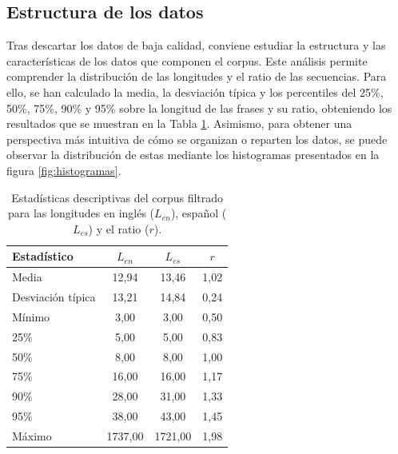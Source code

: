 \subsection{Estructura de los datos}

Tras descartar los datos de baja calidad, conviene estudiar la estructura y las características de los datos que componen el corpus. 
Este análisis permite comprender la distribución de las longitudes y el ratio de las secuencias. Para ello, 
se han calculado la media, la desviación típica y los percentiles del 25\%, 50\%, 75\%, 90\% y 95\% sobre la longitud de las frases y su ratio, 
obteniendo los resultados que se muestran en la Tabla \ref{tab:estadisticas_corpus}. Asimismo, 
para obtener una perspectiva más intuitiva de cómo se organizan o reparten los datos, se puede observar 
la distribución de estas mediante los histogramas presentados en la figura \ref{fig:histogramas}.

\begin{table}[t]
\centering
\begin{tabular}{lccc}
\hline
\textbf{Estadístico} & \textbf{$L_{en}$} & \textbf{$L_{es}$} & \textbf{$r$} \\ \hline
Media                & 12,94             & 13,46             & 1,02                 \\
Desviación típica    & 13,21             & 14,84             & 0,24                 \\
Mínimo               & 3,00              & 3,00              & 0,50                 \\
25\%                 & 5,00              & 5,00              & 0,83                 \\
50\%                 & 8,00              & 8,00              & 1,00                 \\
75\%                 & 16,00             & 16,00             & 1,17                 \\
90\%                 & 28,00             & 31,00             & 1,33                 \\
95\%                 & 38,00             & 43,00             & 1,45                 \\
Máximo               & 1737,00           & 1721,00           & 1,98                 \\ \hline
\end{tabular}
\caption{Estadísticas descriptivas del corpus filtrado para las longitudes en inglés ($L_{en}$), español ($L_{es}$) y el ratio ($r$).}
\label{tab:estadisticas_corpus}
\end{table}

